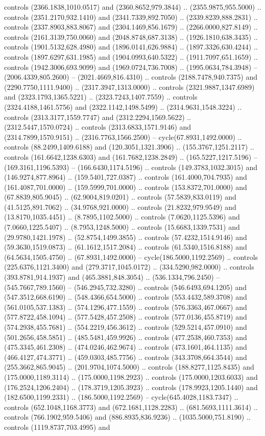 controls (2366.1838,1010.0517) and (2360.8652,979.3844) .. (2355.9875,955.5000) .. controls (2351.2170,932.1410) and (2341.7339,892.7050) .. (2339.8239,888.2831) .. controls (2337.8903,883.8067) and (2304.1469,856.1679) .. (2266.0000,827.8149) .. controls (2161.3139,750.0060) and (2048.8748,687.3138) .. (1926.1810,638.3435) .. controls (1901.5132,628.4980) and (1896.0141,626.9884) .. (1897.3326,630.4244) .. controls (1897.6297,631.1985) and (1904.0993,640.5322) .. (1911.7097,651.1659) .. controls (1942.3006,693.9099) and (1969.0724,736.7008) .. (1995.0634,784.3948) -- (2006.4339,805.2600) -- (2021.4669,816.4310) .. controls (2188.7478,940.7375) and (2290.7750,1111.9400) .. (2317.3947,1313.0000) .. controls (2321.9887,1347.6989) and (2323.1793,1365.5221) .. (2323.7243,1407.7559) .. controls (2324.4188,1461.5756) and (2322.1142,1498.5499) .. (2314.9631,1548.3224) .. controls (2313.3177,1559.7747) and (2312.2294,1569.5622) .. (2312.5447,1570.0724) .. controls (2313.6833,1571.9146) and (2314.7899,1570.9151) .. (2316.7763,1566.2500) -- cycle(67.8931,1492.0000) .. controls (88.2499,1409.6188) and (120.3051,1321.3906) .. (155.3767,1251.2117) .. controls (161.6642,1238.6303) and (161.7682,1238.2849) .. (165.5227,1217.5196) -- (169.3161,1196.5393) -- (166.6430,1174.5196) .. controls (149.3783,1032.3015) and (146.9274,877.8964) .. (159.5401,727.0387) .. controls (161.4000,704.7935) and (161.4087,701.0000) .. (159.5999,701.0000) .. controls (153.8372,701.0000) and (67.8839,805.9045) .. (62.9004,819.0201) .. controls (57.5839,833.0119) and (41.5125,891.7062) .. (34.9768,921.0000) .. controls (21.8232,979.9549) and (13.8170,1035.4451) .. (8.7895,1102.5000) .. controls (7.0620,1125.5396) and (7.0660,1225.5407) .. (8.7953,1248.5000) .. controls (15.6683,1339.7531) and (29.9780,1421.1978) .. (52.8754,1499.3855) .. controls (57.4232,1514.9146) and (59.3630,1519.0873) .. (61.1612,1517.2084) .. controls (61.5340,1516.8188) and (64.5634,1505.4750) .. (67.8931,1492.0000) -- cycle(186.5000,1192.2569) .. controls (225.6376,1121.3400) and (279.3717,1045.0172) .. (334.5290,982.0000) .. controls (393.8781,914.1937) and (465.3881,848.3054) .. (536.1334,796.2450) -- (545.7667,789.1560) -- (546.2945,732.3280) .. controls (546.6493,694.1205) and (547.3512,668.6190) .. (548.4366,654.5000) .. controls (553.4432,589.3708) and (561.0105,537.1383) .. (574.1296,477.1559) .. controls (576.3363,467.0667) and (577.8722,458.1094) .. (577.5428,457.2508) .. controls (577.0136,455.8719) and (574.2938,455.7681) .. (554.2219,456.3612) .. controls (529.5214,457.0910) and (501.2656,458.5851) .. (485.5481,459.9926) .. controls (477.2538,460.7353) and (475.3345,461.2308) .. (474.0246,462.9674) .. controls (473.1601,464.1135) and (466.4127,474.3771) .. (459.0303,485.7756) .. controls (343.3708,664.3544) and (255.3662,865.9045) .. (201.9704,1074.5000) .. controls (188.8277,1125.8435) and (175.0000,1189.3114) .. (175.0000,1198.2923) .. controls (175.0000,1203.6033) and (176.2524,1206.2404) .. (178.3719,1205.3923) .. controls (178.9923,1205.1440) and (182.6500,1199.2331) .. (186.5000,1192.2569) -- cycle(645.4028,1183.7347) .. controls (652.1048,1168.3773) and (672.1681,1128.2283) .. (681.5693,1111.3614) .. controls (766.1902,959.5406) and (886.8935,836.9236) .. (1035.5000,751.8190) .. controls (1119.8737,703.4995) and 